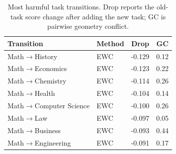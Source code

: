 \documentclass{article}
\begin{document}
\begin{table}[!htbp]
\centering
\caption{
{Most harmful task transitions.}
Drop reports the old-task score change after adding the new task; GC is pairwise geometry conflict.
}
\label{tab:app_top_harmful_pairs}
{
\renewcommand{\arraystretch}{1.08}
\begin{tabular}{llcc}
\toprule[0.9pt]
\rowcolor{sizeBand}
Transition & Method & Drop & GC \\
\midrule
\rowcolor{rcwmBlue} Math$\rightarrow$History & EWC & -0.129 & 0.12 \\
\rowcolor{rcwmBlue} Math$\rightarrow$Economics & EWC & -0.123 & 0.22 \\
\rowcolor{rcwmBlue} Math$\rightarrow$Chemistry & EWC & -0.114 & 0.26 \\
\rowcolor{mergeBlue} Math$\rightarrow$Health & EWC & -0.104 & 0.14 \\
\rowcolor{mergeBlue} Math$\rightarrow$Computer Science & EWC & -0.100 & 0.26 \\
\rowcolor{mergeBlue} Math$\rightarrow$Law & EWC & -0.097 & 0.05 \\
\rowcolor{refGray} Math$\rightarrow$Business & EWC & -0.093 & 0.44 \\
\rowcolor{refGray} Math$\rightarrow$Engineering & EWC & -0.091 & 0.17 \\
\bottomrule[0.9pt]
\end{tabular}
}

\end{table}


\end{document}
